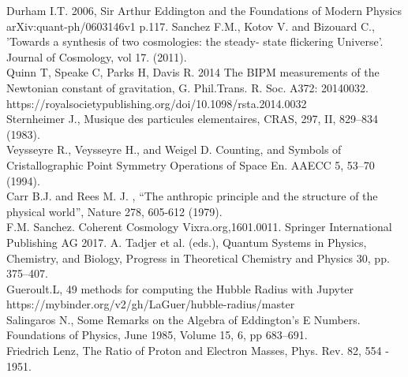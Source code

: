 \documentclass[a4paper,9pt]{article}
\begin{document}
\begin{thebibliography}{99}
 Durham I.T. 2006, Sir Arthur Eddington and the Foundations of Modern Physics arXiv:quant-ph/0603146v1  p.117.
 Sanchez F.M., Kotov V. and Bizouard C., 'Towards a synthesis of two cosmologies: the steady- state flickering Universe'. Journal of Cosmology, vol 17. (2011).\\
 Quinn T, Speake C, Parks H, Davis R. 2014 The BIPM measurements of the Newtonian constant of gravitation, G. Phil.Trans. R. Soc. A372: 20140032. https://royalsocietypublishing.org/doi/10.1098/rsta.2014.0032 \\
 Sternheimer J., Musique des particules elementaires, CRAS, 297, II, 829--834 (1983).\\
 Veysseyre R., Veysseyre H., and Weigel D. Counting, and Symbols of Cristallographic Point Symmetry Operations of Space En. AAECC 5, 53--70 (1994).\\
 Carr B.J. and Rees M. J. , “The anthropic principle and the structure of the physical world”, Nature 278, 605-612 (1979).\\
 F.M. Sanchez. Coherent Cosmology Vixra.org,1601.0011. Springer International Publishing AG 2017. A. Tadjer et al. (eds.), Quantum Systems in Physics, Chemistry, and Biology, Progress in Theoretical Chemistry and Physics 30, pp. 375--407. \\ 
 Gueroult.L, 49 methods for computing the Hubble Radius with Jupyter https://mybinder.org/v2/gh/LaGuer/hubble-radius/master \\
 Salingaros N., Some Remarks on the Algebra of Eddington's E Numbers. Foundations of Physics, June 1985, Volume 15, 6, pp 683–691.\\
 Friedrich Lenz, The Ratio of Proton and Electron Masses, Phys. Rev. 82, 554 - 1951.\\







\end{thebibliography}
\end{document}
